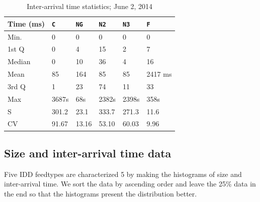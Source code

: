 \begin{table}
    \centering
      \caption{Inter-arrival time statistics; June 2, 2014} \label{tab:inter-arr-time-summary}
\begin{tabular}{|l|l|l|l|l|l|}     \hline
    \textbf{Time (ms)}            & \textbf{\texttt{C}} &  \textbf{\texttt{NG}}  & \textbf{\texttt{N2}} & \textbf{\texttt{N3}} & \textbf{\texttt{F}} \\ \hline
    Min.                             & 0        	   & 0 		& 0	 		 & 0	 		 & 0\\ \hline
    1st Q        	      & 0	           & 4 		& 15	   		 & 2			 & 7\\ \hline
    Median                        & 0	           & 10 		& 36		     	 & 4			 & 16\\ \hline
    Mean                           & 85      	  & 164 		& 85		     	 & 85			 & 2417 ms\\ \hline
    3rd Q                & 1	          & 23 		& 74   		& 11			 & 33\\ \hline
    Max                             & 3687s   & 68s    	& 2382s   	 & 2398s	 & 358s\\ \hline
    S		      & 301.2  & 23.1 	& 333.7   	& 271.3	& 11.6\\ \hline
    CV			      & 91.67  & 13.16    	& 53.10 	& 60.03	& 9.96\\ \hline
    \end{tabular}

\end{table}



\subsection{Size and inter-arrival time data}
\label{sec:size-arrtime}
Five IDD feedtypes are characterized 5 by making the histograms of size and inter-arrival time. We sort the data by ascending order and leave the 25\% data in the end so that the histograms present the distribution better.


